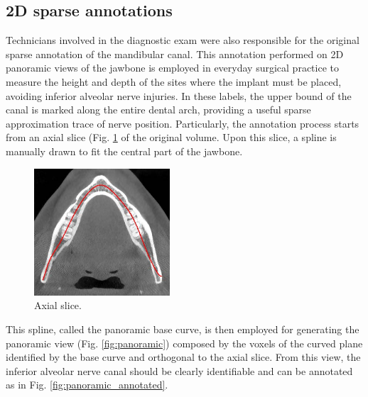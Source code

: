 \subsection{2D sparse annotations}
Technicians involved in the diagnostic exam were also responsible for the
original sparse annotation of the mandibular canal. This annotation performed on
2D panoramic views of the jawbone is employed in everyday surgical practice to
measure the height and depth of the sites where the implant must be placed,
avoiding inferior alveolar nerve injuries. In these labels, the upper bound of
the canal is marked along the entire dental arch, providing a useful sparse
approximation trace of nerve position. Particularly, the annotation process
starts from an axial slice (Fig. \ref{fig:axial-slice} of the original volume.
Upon this slice, a spline is manually drawn to fit the central part of the
jawbone.

\begin{figure}[ht]
  \centering
  \includegraphics[width=0.45\textwidth]{Images/axial-slice.jpg}
  \caption{Axial slice.}
  \label{fig:axial-slice}
\end{figure}

This spline, called the panoramic base curve, is then employed for generating
the panoramic view (Fig. \ref{fig:panoramic}) composed by the voxels of the
curved plane identified by the base curve and orthogonal to the axial slice.
From this view, the inferior alveolar nerve canal should be clearly identifiable
and can be annotated as in Fig. \ref{fig:panoramic_annotated}.


